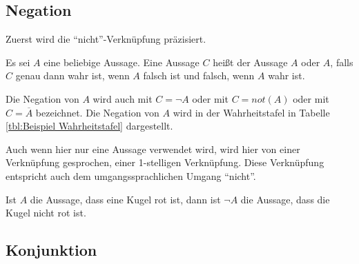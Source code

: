 \subsection*{Negation}

\begin{Unit} Zuerst wird die \enquote{nicht}-Verknüpfung
präzisiert.

\begin{Definition}
Es sei $A$ eine beliebige Aussage. Eine Aussage $C$ heißt  
der Aussage $A$ oder  $A$, falls $C$ genau dann wahr ist, 
wenn $A$ falsch ist und falsch, wenn $A$ wahr ist. 
\end{Definition}

Die Negation von $A$ wird auch mit $C = \neg A$ oder mit $C = not(A)$ oder 
mit $C = \overline{A}$ bezeichnet. Die Negation von $A$ wird in der
Wahrheitstafel in Tabelle \ref{tbl:Beispiel Wahrheitstafel} dargestellt.

Auch wenn hier nur eine Aussage verwendet wird, wird hier von einer 
Verknüpfung gesprochen, einer 1-stelligen Verknüpfung. Diese Verknüpfung 
entspricht auch dem umgangssprachlichen Umgang \enquote{nicht}.
\end{Unit}

\begin{Unit}[Beispiel]
Ist $A$ die Aussage, dass eine Kugel rot ist, dann ist $\neg A$ die Aussage, 
dass die Kugel nicht rot ist.
\end{Unit}

\subsection*{Konjunktion}

